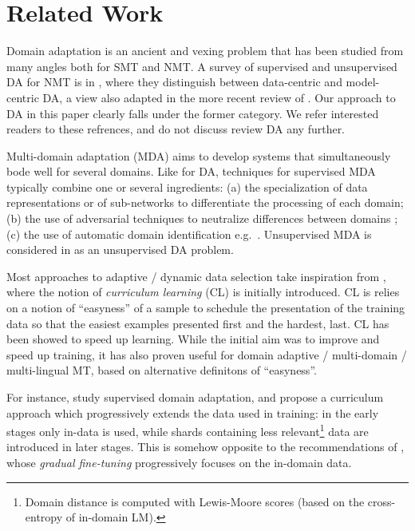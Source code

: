 \documentclass[11pt,a4paper]{article}
\newcommand{\fyTodo}[1]{\Todo[FY:]{\textcolor{orange}{#1}}}
\begin{document}
\fyTodo{Refaire table 3 + (unsupervised domain in source= classification) + new domain}

\section{Related Work \label{sec:related}}

Domain adaptation is an ancient and vexing problem that has been studied from many angles both for SMT and NMT. A survey of supervised and unsupervised DA for NMT is in \cite{Chu18asurvey}, where they distinguish between data-centric and model-centric DA, a view also adapted in the more recent review of \cite{Saunders21domain}. Our approach to DA in this paper clearly falls under the former category. We refer interested readers to these refrences, and do not discuss review DA any further.

Multi-domain adaptation (MDA) aims to develop systems that simultaneously bode well for several domains. Like for DA, techniques for supervised MDA typically combine one or several ingredients: (a) the specialization of data representations \citep{Kobus17domaincontrol} or of sub-networks \citep{Pham19generic} to differentiate the processing of each domain; (b) the use of adversarial techniques to neutralize differences between domains \cite{Britz17mixing,Zeng18multidomain}; (c) the use of automatic domain identification e.g.\ \citep{Jiang19multidomain}. Unsupervised MDA is considered in \citep{Farajian17multidomain} as an unsupervised DA problem.

Most approaches to adaptive / dynamic data selection take inspiration from \citep{Bengio09curriculum}, where the notion of \emph{curriculum learning} (CL) is initially introduced. CL is relies on a notion of ``easyness'' of a sample to schedule the presentation of the training data so that the easiest examples  presented first and the hardest, last. CL has been showed to speed up learning. While the initial aim was to improve and speed up training, it has also proven useful for domain adaptive / multi-domain / multi-lingual MT, based on alternative definitons of ``easyness''.

For instance, \citet{Zhang19curriculum} study supervised domain adaptation, and propose a curriculum approach which progressively extends the data used in training: in the early stages only in-data is used, while shards containing less relevant\footnote{Domain distance is computed with Lewis-Moore scores (based on the cross-entropy of in-domain LM).} data are introduced in later stages. This is somehow opposite to the recommendations of \cite{Vanderwees17dynamic}, whose \emph{gradual fine-tuning} progressively focuses on the in-domain data.\fyTodo{These have not been compared ? and also to what we do ?} 
\end{document}
